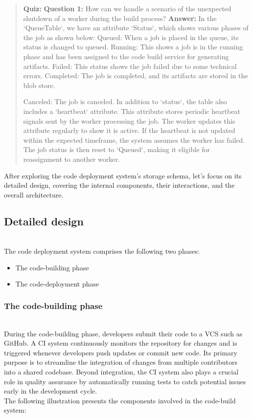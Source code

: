 \begin{quote}
\textbf{Quiz:}
\textbf{Question 1:} How can we handle a scenario of the unexpected shutdown of a worker during the build process?
\textbf{Answer:} In the `QueueTable`, we have an attribute `Status`, which shows various phases of the job as shown below: Queued: When a job is placed in the queue, its status is changed to queued. Running: This shows a job is in the running phase and has been assigned to the code build service for generating artifacts. Failed: This status shows the job failed due to some technical errors. Completed: The job is completed, and its artifacts are stored in the blob store.

Canceled: The job is canceled. In addition to `status`, the table also includes a `heartbeat` attribute. This attribute stores periodic heartbeat signals sent by the worker processing the job. The worker updates this attribute regularly to show it is active. If the heartbeat is not updated within the expected timeframe, the system assumes the worker has failed. The job status is then reset to `Queued`, making it eligible for reassignment to another worker.
\end{quote}

After exploring the code deployment system's storage schema, let's focus on its detailed design, covering the internal components, their interactions, and the overall architecture.

\subsection{Detailed design}\label{uLpkxZEo00-VxcHILwBbE}
\\
The code deployment system comprises the following two phases:

\begin{itemize}
\item
\protect{}\label{7uWI7i6vfDitnpsIEKPDD}
The code-building phase
\item
\protect{}\label{Pt4m7lbgDFT21rF9QWjKF}
The code-deployment phase
\end{itemize}

\subsubsection{The code-building phase}\label{A3KR3kv6kUOS879LUAqMS}
\\
During the code-building phase, developers submit their code to a VCS such as GitHub. A CI system continuously monitors the repository for changes and is triggered whenever developers push updates or commit new code. Its primary purpose is to streamline the integration of changes from multiple contributors into a shared codebase. Beyond integration, the CI system also plays a crucial role in quality assurance by automatically running tests to catch potential issues early in the development cycle.
\\
The following illustration presents the components involved in the code-build system:\\

